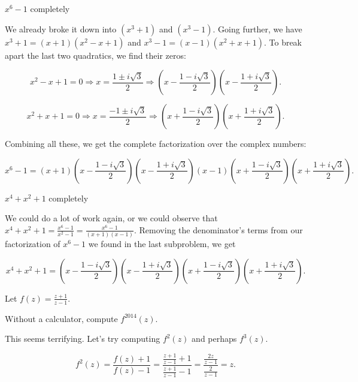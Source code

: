 \documentclass[../key.tex]{subfiles}
\begin{document}
\begin{inner_problem}
\item $x^6-1$ completely
\end{inner_problem}

We already broke it down into $(x^3+1)$ and $(x^3-1)$. Going further, we have $x^3+1 = (x+1)(x^2-x+1)$ and $x^3-1=(x-1)(x^2+x+1)$. To break apart the last two quadratics, we find their zeros:

$$x^2-x+1=0 \Longrightarrow x = \frac{1 \pm i\sqrt{3}}{2} \Longrightarrow \left(x - \frac{1 - i\sqrt{3}}{2}\right) \left(x - \frac{1 + i\sqrt{3}}{2}\right).$$

$$x^2+x+1=0 \Longrightarrow x = \frac{-1 \pm i\sqrt{3}}{2} \Longrightarrow \left(x + \frac{1 - i\sqrt{3}}{2}\right) \left(x + \frac{1 + i\sqrt{3}}{2}\right).$$

Combining all these, we get the complete factorization over the complex numbers:

$$x^6-1 = (x+1)\left(x - \frac{1 - i\sqrt{3}}{2}\right) \left(x - \frac{1 + i\sqrt{3}}{2}\right)(x-1)\left(x + \frac{1 - i\sqrt{3}}{2}\right) \left(x + \frac{1 + i\sqrt{3}}{2}\right).$$

\begin{inner_problem}
\item $x^4+x^2+1$ completely
\end{inner_problem}

We could do a lot of work again, or we could observe that $x^4+x^2+1 = \frac{x^6 - 1}{x^2 - 1} = \frac{x^6 - 1}{(x+1)(x-1)}$. Removing the denominator's terms from our factorization of $x^6-1$ we found in the last subproblem, we get

$$x^4+x^2+1 = \left(x - \frac{1 - i\sqrt{3}}{2}\right) \left(x - \frac{1 + i\sqrt{3}}{2}\right)\left(x + \frac{1 - i\sqrt{3}}{2}\right) \left(x + \frac{1 + i\sqrt{3}}{2}\right).$$

\begin{outer_problem}
\item Let $f(z)=\frac{z+1}{z-1}$.
\end{outer_problem}

\begin{inner_problem}[start=1]
\item Without a calculator, compute $f^{2014}(z)$.
\end{inner_problem}

This seems terrifying. Let's try computing $f^2(z)$ and perhaps $f^3(z)$.

$$f^2(z) = \frac{f(z)+1}{f(z)-1} = \frac{\frac{z+1}{z-1}+1}{\frac{z+1}{z-1}-1} = \frac{\frac{2z}{z-1}}{\frac{2}{z-1}} = z.$$
\end{document}
